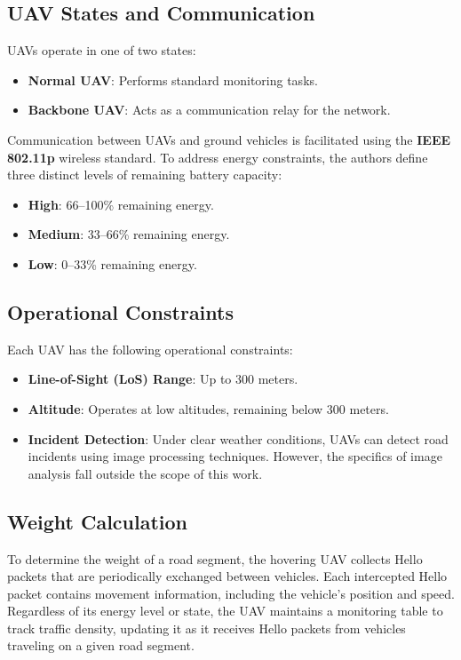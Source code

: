 \vspace{\baselineskip} %

\subsection{UAV States and Communication}
UAVs operate in one of two states:
\begin{itemize}
    \item \textbf{Normal UAV}: Performs standard monitoring tasks.
    \item \textbf{Backbone UAV}: Acts as a communication relay for the network.
\end{itemize}

Communication between UAVs and ground vehicles is facilitated using the \textbf{IEEE 802.11p} wireless standard. To address energy constraints, the authors define three distinct levels of remaining battery capacity:
\begin{itemize}
    \item \textbf{High}: 66–100\% remaining energy.
    \item \textbf{Medium}: 33–66\% remaining energy.
    \item \textbf{Low}: 0–33\% remaining energy.
\end{itemize}

\vspace{\baselineskip} %

\subsection{Operational Constraints}
Each UAV has the following operational constraints:
\begin{itemize}
    \item \textbf{Line-of-Sight (LoS) Range}: Up to 300 meters.
    \item \textbf{Altitude}: Operates at low altitudes, remaining below 300 meters.
    \item \textbf{Incident Detection}: Under clear weather conditions, UAVs can detect road incidents using image processing techniques. However, the specifics of image analysis fall outside the scope of this work.
\end{itemize}

\vspace{\baselineskip} %

\subsection{Weight Calculation}
To determine the weight of a road segment, the hovering UAV collects Hello packets that are periodically exchanged between vehicles. Each intercepted Hello packet contains movement information, including the vehicle's position and speed. Regardless of its energy level or state, the UAV maintains a monitoring table to track traffic density, updating it as it receives Hello packets from vehicles traveling on a given road segment.

